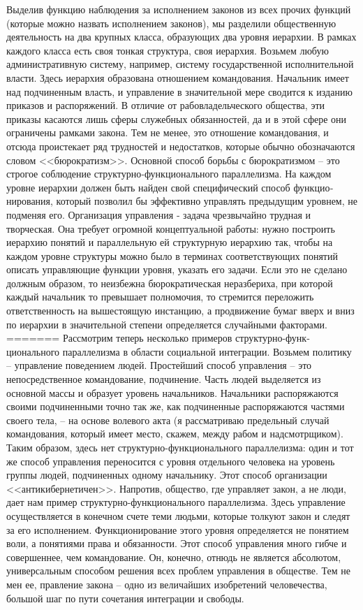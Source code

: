 \documentclass{book}
\begin{document}
Выделив функцию наблюдения за исполнением законов из всех прочих функций (которые можно назвать исполнением законов), мы разделили общественную деятельность на два крупных класса, образующих два уровня иерархии. В рамках каждого класса есть своя тонкая структура, своя иерархия. Возьмем любую административную систему, например, си­стему государственной исполнительной власти. Здесь иерархия образована отношением командования. Начальник имеет над подчиненным власть, и управление в значительной мере сво­дится к изданию приказов и распоряжений. В отличие от рабо­владельческого общества, эти приказы касаются лишь сферы служебных обязанностей, да и в этой сфере они ограничены рамками закона. Тем не менее, это отношение командования, и отсюда проистекает ряд трудностей и недостатков, которые обычно обозначаются словом <<бюрократизм>>. Основной способ борьбы с бюрократизмом -- это строгое соблюдение структур­но‑функционального параллелизма. На каждом уровне иерар­хии должен быть найден свой специфический способ функцио­нирования, который позволил бы эффективно управлять преды­дущим уровнем, не подменяя его. Организация управления ‑ задача чрезвычайно трудная и творческая. Она требует огром­ной концептуальной работы: нужно построить иерархию поня­тий и параллельную ей структурную иерархию так, чтобы на каждом уровне структуры можно было в терминах соответствующих понятий описать управляющие функции уровня, ука­зать его задачи. Если это не сделано должным образом, то неиз­бежна бюрократическая неразбериха, при которой каждый на­чальник то превышает полномочия, то стремится переложить ответственность на вышестоящую инстанцию, а продвижение бумаг вверх и вниз по иерархии в значительной степени опре­деляется случайными факторами.
=======
Рассмотрим теперь несколько примеров структурно-функ­ционального параллелизма в области социальной интеграции. Возьмем политику -- управление поведением людей. Простей­ший способ управления -- это непосредственное командование, подчинение. Часть людей выделяется из основной массы и обра­зует уровень начальников. Начальники распоряжаются своими подчиненными точно так же, как подчиненные распоряжаются частями своего тела, -- на основе волевого акта (я рассматри­ваю предельный случай командования, который имеет место, скажем, между рабом и надсмотрщиком). Таким образом, здесь нет структурно-функционального параллелизма: один и тот же способ управления переносится с уровня отдельного че­ловека на уровень группы людей, подчиненных одному началь­нику. Этот способ организации <<антикибернетичен>>. Напротив, общество, где управляет закон,  а не люди,  дает нам пример структурно-функционального параллелизма. Здесь управление осуществляется в конечном счете теми людьми, которые тол­куют закон и следят за его исполнением.
 Функционирование этого уровня определяется не понятием воли,  а понятиями права  и обязанности.  Этот способ управления много гибче и совер­шеннее, чем командование. Он, конечно, отнюдь не является абсолютом, универсальным способом решения всех проблем управления в обществе. Тем не мен ее, правление закона -- одно из величайших изобретений человечества, большой шаг по пу­ти сочетания интеграции и свободы.
\end{document}
